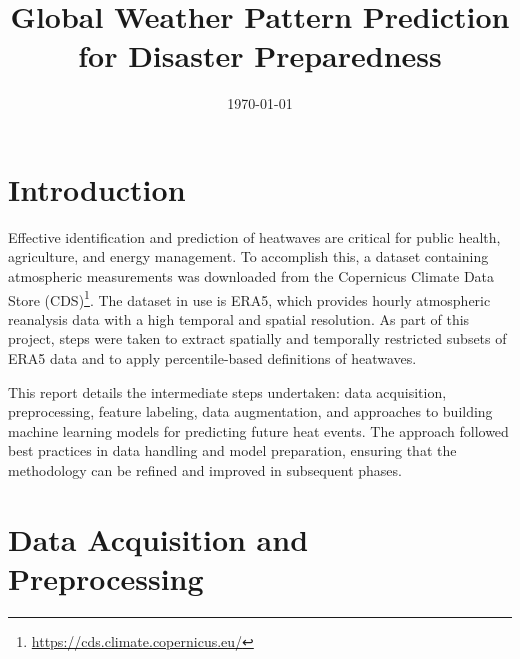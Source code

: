 \documentclass[conference,9pt]{IEEEtran}
\title{Global Weather Pattern Prediction for Disaster Preparedness}
\author{\IEEEauthorblockN{Jonas Thalmeier, Ana Martinez}}
\date{\today}
\begin{document}
\maketitle


\section{Introduction}
Effective identification and prediction of heatwaves are critical for public health, agriculture, and energy management. To accomplish this, a dataset containing atmospheric measurements was downloaded from the Copernicus Climate Data Store (CDS)\footnote{\url{https://cds.climate.copernicus.eu/}}. The dataset in use is ERA5, which provides hourly atmospheric reanalysis data with a high temporal and spatial resolution. As part of this project, steps were taken to extract spatially and temporally restricted subsets of ERA5 data and to apply percentile-based definitions of heatwaves.

This report details the intermediate steps undertaken: data acquisition, preprocessing, feature labeling, data augmentation, and  approaches to building machine learning models for predicting future heat events. The approach followed best practices in data handling and model preparation, ensuring that the methodology can be refined and improved in subsequent phases.

\section{Data Acquisition and Preprocessing}
\end{document}
